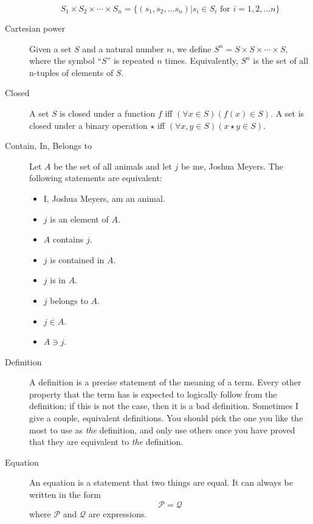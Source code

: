 \documentclass[12pt]{article}
\begin{document}
\begin{description}
    $$S_1\times S_2\times\cdots\times S_n = \{(s_1,s_2,\ldots
    s_n)|s_i\in S_i\textrm{ for }i=1,2,\ldots n\}$$

  \item[Cartesian power] Given a set $S$ and a natural number $n$, we
    define $S^n=S\times S\times\cdots\times S$, where the symbol
    ``$S$'' is repeated $n$ times.  Equivalently, $S^n$ is the set of
    all n-tuples of elements of $S$.

  \item[Closed] A set $S$ is closed under a function $f$ iff
    $(\forall x\in S)(f(x)\in S)$.  A set is closed under a binary
    operation $\star$ iff $(\forall x,y\in S)(x\star y\in S)$.
  
  \item[Contain, In, Belongs to] Let $A$ be the set of all animals and let
    $j$ be me, Joshua Meyers.  The following statements are
    equivalent:
    \begin{itemize}
    \item I, Joshua Meyers, am an animal. 
    \item $j$ is an element of $A$. 
    \item $A$ contains $j$. 
    \item $j$ is contained in $A$. 
    \item $j$ is in $A$.
    \item $j$ belongs to $A$.
    \item $j\in A$. 
    \item $A\ni j$. 
    \end{itemize}

  \item[Definition] A definition is a precise statement of the meaning
    of a term.  Every other property that the term has is expected to
    logically follow from the definition; if this is not the case,
    then it is a bad definition.  Sometimes I give a couple,
    equivalent definitions.  You should pick the one you like the most
    to use as \textit{the} definition, and only use others once you
    have proved that they are equivalent to \textit{the} definition.

  \item[Equation] An equation is a statement that two things are
    equal.  It can always be written in the form
    $$\mathcal{P}=\mathcal{Q}$$ where $\mathcal{P}$ and $\mathcal{Q}$
    are expressions.
    

\end{description}
\end{document}
